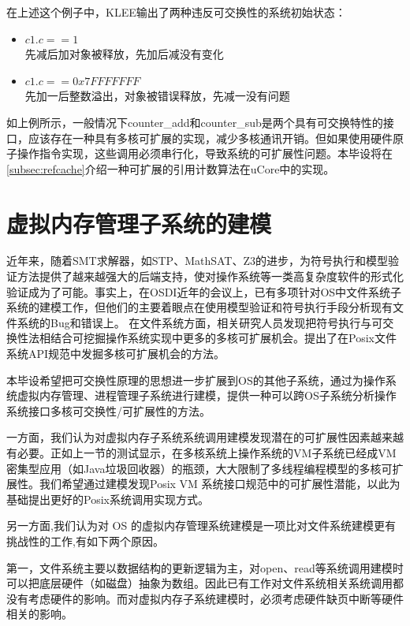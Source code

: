 在上述这个例子中，KLEE输出了两种违反可交换性的系统初始状态：
\begin{itemize}
	\item ${c1.c == 1}$ \\
		先减后加对象被释放，先加后减没有变化
	\item ${c1.c ==
		0x7FFFFFFF}$ \\
		先加一后整数溢出，对象被错误释放，先减一没有问题
\end{itemize}

如上例所示，一般情况下counter\_add和counter\_sub是两个具有可交换特性的接口，应该存在一种具有多核可扩展的实现，减少多核通讯开销。但如果使用硬件原子操作指令实现，这些调用必须串行化，导致系统的可扩展性问题。本毕设将在\ref{subsec:refcache}介绍一种可扩展的引用计数算法在uCore中的实现。

\section{虚拟内存管理子系统的建模}
\label{sec:vm-model}

近年来，随着SMT求解器，如STP、MathSAT、Z3\cite{DeMoura:2008:ZES:1792734.1792766}的进步，为符号执行和模型验证方法提供了越来越强大的后端支持，使对操作系统等一类高复杂度软件的形式化验证成为了可能。事实上，在OSDI近年的会议上，已有多项针对OS中文件系统子系统的建模工作\cite{radixvm:eurosys13, Yang:2006:UMC:1189256.1189259}，但他们的主要着眼点在使用模型验证和符号执行手段分析现有文件系统的Bug和错误上。
在文件系统方面，相关研究人员发现把符号执行与可交换性法相结合可挖掘操作系统实现中更多的多核可扩展机会。提出了在Posix文件系统API规范中发掘多核可扩展机会的方法。

本毕设希望把可交换性原理的思想进一步扩展到OS的其他子系统，通过为操作系统虚拟内存管理、进程管理子系统进行建模，提供一种可以跨OS子系统分析操作系统接口多核可交换性/可扩展性的方法。

一方面，我们认为对虚拟内存子系统系统调用建模发现潜在的可扩展性因素越来越有必要。正如上一节的测试显示，在多核系统上操作系统的VM子系统已经成VM密集型应用（如Java垃圾回收器）的瓶颈，大大限制了多线程编程模型的多核可扩展性。我们希望通过建模发现Posix VM 系统接口规范中的可扩展性潜能，以此为基础提出更好的Posix系统调用实现方式。

另一方面,我们认为对 OS 的虚拟内存管理系统建模是一项比对文件系统建模更有挑战性的工作,有如下两个原因。

第一，文件系统主要以数据结构的更新逻辑为主，对open、read等系统调用建模时可以把底层硬件（如磁盘）抽象为数组。因此已有工作对文件系统相关系统调用都没有考虑硬件的影响。而对虚拟内存子系统建模时，必须考虑硬件缺页中断等硬件相关的影响。


